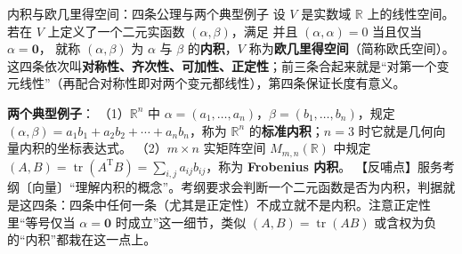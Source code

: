 \begin{fdeep}{内积与欧几里得空间：四条公理与两个典型例子}
设 $V$ 是实数域 $\mathbb{R}$ 上的线性空间。若在 $V$ 上定义了一个二元实函数 $(\alpha,\beta)$，满足
并且 $(\alpha,\alpha)=0$ 当且仅当 $\alpha=\mathbf{0}$，
就称 $(\alpha,\beta)$ 为 $\alpha$ 与 $\beta$ 的\textbf{内积}，$V$ 称为\textbf{欧几里得空间}（简称欧氏空间）。这四条依次叫\textbf{对称性、齐次性、可加性、正定性}；前三条合起来就是“对第一个变元线性”（再配合对称性即对两个变元都线性），第四条保证长度有意义。

\textbf{两个典型例子}：
（1）$\mathbb{R}^n$ 中 $\alpha=(a_1,\dots,a_n)$，$\beta=(b_1,\dots,b_n)$，规定 $(\alpha,\beta)=a_1b_1+a_2b_2+\cdots+a_nb_n$，称为 $\mathbb{R}^n$ 的\textbf{标准内积}；$n=3$ 时它就是几何向量内积的坐标表达式。
（2）$m\times n$ 实矩阵空间 $M_{m,n}(\mathbb{R})$ 中规定 $(A,B)=\operatorname{tr}(A^{\mathrm T}B)=\sum_{i,j}a_{ij}b_{ij}$，称为 \textbf{Frobenius 内积}。
【反哺点】服务考纲〔向量〕“理解内积的概念”。考纲要求会判断一个二元函数是否为内积，判据就是这四条：四条中任何一条（尤其是正定性）不成立就不是内积。注意正定性里“等号仅当 $\alpha=\mathbf{0}$ 时成立”这一细节，类似 $(A,B)=\operatorname{tr}(AB)$ 或含权为负的“内积”都栽在这一点上。
\end{fdeep}

